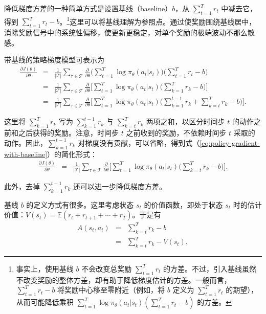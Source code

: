 降低梯度方差的一种简单方式是设置基线（baseline）$b$，从 $\sum_{t=1}^{T} r_t$ 中减去它，得到 $\sum_{t=1}^{T} r_t - b$。\footnote{事实上，使用基线 $b$ 不会改变总奖励 $\sum_{t=1}^{T} r_t$ 的方差。不过，引入基线虽然不改变奖励的整体方差，却有助于降低梯度估计的方差。一般而言，$\sum_{t=1}^{T} r_t - b$ 将奖励中心移至零附近（例如，将 $b$ 定义为 $\sum_{t=1}^{T} r_t$ 的期望），从而可能降低乘积 $\sum_{t=1}^{T} \log \pi_{\theta}(a_t|s_t) (\sum_{t=1}^{T} r_t - b)$ 的方差。}这里可以将基线理解为参照点。通过使奖励围绕基线居中，消除奖励信号中的系统性偏移，使更新更稳定，对单个奖励的极端波动不那么敏感。

带基线的策略梯度模型可表示为
\begin{eqnarray}
\frac{\partial J(\theta)}{\partial \theta} & = & \frac{1}{|\mathcal{T}|} \sum_{\tau \in \mathcal{T}} \frac{\partial}{\partial \theta} \Big( \sum_{t=1}^{T} \log \pi_{\theta}(a_t|s_t) \Big) \Big(\sum_{t=1}^{T} r_t - b \Big) \nonumber \\
& = & \frac{1}{|\mathcal{T}|} \sum_{\tau \in \mathcal{T}} \frac{\partial}{\partial \theta} \Big[ \sum_{t=1}^{T} \log \pi_{\theta}(a_t|s_t) \Big(\sum_{k=1}^{T} r_k - b \Big) \Big] \nonumber \\
& = & \frac{1}{|\mathcal{T}|} \sum_{\tau \in \mathcal{T}} \frac{\partial}{\partial \theta} \Big[ \sum_{t=1}^{T} \log \pi_{\theta}(a_t|s_t) \Big(\sum_{k=1}^{t-1} r_k + \sum_{k=t}^{T} r_k - b \Big) \Big]. \label{eq:policy-gradient-with-baseline}
\end{eqnarray}

\noindent 这里将 $\sum_{k=1}^{T} r_k$ 写为 $\sum_{k=1}^{t-1} r_k$ 与 $\sum_{k=t}^{T} r_k$ 两项之和，以区分时间步 $t$ 的动作之前和之后获得的奖励。注意，时间步 $t$ 之前收到的奖励，不依赖时间步 $t$ 采取的动作。因此，$\sum_{k=1}^{t-1} r_k$ 对梯度没有贡献，可以省略，得到式（\ref{eq:policy-gradient-with-baseline}）的简化形式：
\begin{eqnarray}
\frac{\partial J(\theta)}{\partial \theta} & = & \frac{1}{|\mathcal{T}|} \sum_{\tau \in \mathcal{T}} \frac{\partial}{\partial \theta} \Big[ \sum_{t=1}^{T} \log \pi_{\theta}(a_t|s_t) \Big(\sum_{k=t}^{T} r_k - b \Big) \Big].
\end{eqnarray}

\noindent 此外，去掉 $\sum_{k=1}^{t-1} r_k$ 还可以进一步降低梯度方差。

基线 $b$ 的定义方式有很多。这里考虑状态 $s_t$ 的价值函数，即处于状态 $s_t$ 时的估计价值：$V(s_t) = \mathbb{E}(r_t + r_{t+1} + \cdots + r_{T})$。于是有
\begin{eqnarray}
A(s_t,a_t) & = & \sum_{k=t}^{T} r_k - b \nonumber \\
           & = & \sum_{k=t}^{T} r_k - V(s_t),
\end{eqnarray}

